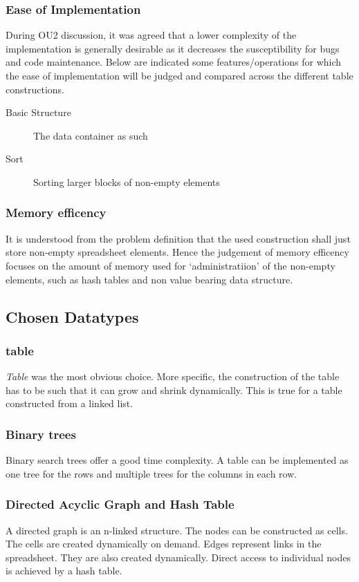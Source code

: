\documentclass[a4paper,11pt,twoside]{article}
\begin{document}
\subsubsection{Ease of Implementation}
During OU2 discussion, it was agreed that a lower complexity
of the implementation is generally desirable as it decreases the
susceptibility for bugs and code maintenance. Below are indicated some
features/operations for which the ease of implementation will be
judged and compared across the different table constructions.

\begin{description}
\item[Basic Structure] The data container as such
\item[Sort] Sorting larger blocks of non-empty elements
\end{description}

\subsubsection{Memory efficency}
It is understood from the problem definition that the used
construction shall just store non-empty spreadsheet elements. Hence
the judgement of memory efficency focuses on the amount of
memory used for `administratiion' of the non-empty elements, such as
hash tables and non value bearing data structure. 


\subsection{Chosen Datatypes}
\subsubsection{table}
\emph{Table} was the most obvious choice. More specific, the
construction of the table has to be such that it can grow
and shrink dynamically. This is true for a table constructed from a
linked list. 

\subsubsection{Binary trees}
Binary search trees offer a good time complexity. A table can be
implemented as one tree for the rows and multiple trees for the
columns in each row. 

\subsubsection{Directed Acyclic Graph and Hash Table}
A directed graph is an n-linked structure. The nodes can be
constructed as cells. The cells are created dynamically on demand. 
Edges represent links in the spreadsheet. They are also created 
dynamically. Direct access to individual nodes is achieved by a hash
table. 
\end{document}
